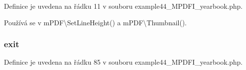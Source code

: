 Definice je uvedena na řádku 11 v souboru example44\-\_\-\-M\-P\-D\-F\-I\-\_\-yearbook.\-php.



Používá se v m\-P\-D\-F\textbackslash{}\-Set\-Line\-Height() a m\-P\-D\-F\textbackslash{}\-Thumbnail().

\hypertarget{example44___m_p_d_f_i__yearbook_8php_a6733eb5f605d09eaede9845835d71c4e}{
\subsubsection[{exit}]{\setlength{\rightskip}{0pt plus 5cm}exit}}\label{example44___m_p_d_f_i__yearbook_8php_a6733eb5f605d09eaede9845835d71c4e}


Definice je uvedena na řádku 85 v souboru example44\-\_\-\-M\-P\-D\-F\-I\-\_\-yearbook.\-php.

